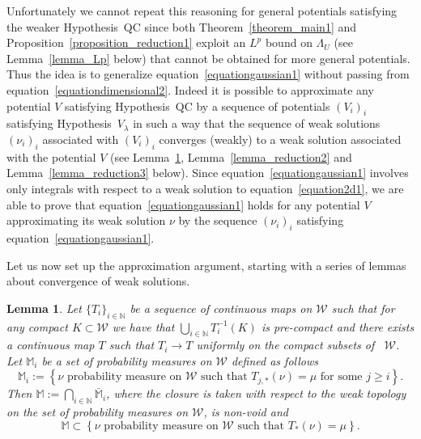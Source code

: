 \documentclass[a4paper,10pt]{article}
\newcommand{\assign}{:=}
\newcommand{\asterisk}{\mathord{*}}
\newtheorem{lemma}[theorem]{Lemma}
\begin{document}
Unfortunately we cannot repeat this reasoning for general potentials
satisfying the weaker Hypothesis~QC since both Theorem~\ref{theorem_main1} and
Proposition~\ref{proposition_reduction1} exploit an $L^p$ bound on $\Lambda_U$
(see Lemma~\ref{lemma_Lp} below) that cannot be obtained for more general
potentials. Thus the idea is to generalize
equation~{\eqref{equationgaussian1}} without passing from
equation~{\eqref{equationdimensional2}}. Indeed it is possible to approximate
any potential $V$ satisfying Hypothesis~QC by a sequence of potentials
$(V_i)_i$ satisfying Hypothesis~$V_{\lambda}$ in such a way that the sequence
of weak solutions $(\nu_i)_i$ associated with $(V_i)_i$ converges (weakly) to
a weak solution associated with the potential $V$ (see
Lemma~\ref{lemma_reduction1}, Lemma~\ref{lemma_reduction2} and
Lemma~\ref{lemma_reduction3} below). Since
equation~{\eqref{equationgaussian1}} involves only integrals with respect to a
weak solution to equation~{\eqref{equation2d1}}, we are able to prove that
equation~{\eqref{equationgaussian1}} holds for any potential $V$ approximating
its weak solution $\nu$ by the sequence $(\nu_i)_i$ satisfying
equation~{\eqref{equationgaussian1}}. \

Let us now set up the approximation argument, starting with a series of
lemmas about convergence of weak solutions.

\begin{lemma}
  \label{lemma_reduction1}Let $\{ T_i \}_{i \in \mathbb{N}}$ be a sequence of
  continuous maps on $\mathcal{W}$ such that for any compact $K \subset
  \mathcal{W}$ we have that $\bigcup_{i \in \mathbb{N}} T_i^{- 1} (K)$ is
  pre-compact and there exists a continuous map $T$ such that $T_i \rightarrow
  T$ uniformly on the compact subsets of \ $\mathcal{W}$. Let $\mathbb{M}_i$
  be a set of probability measures on $\mathcal{W}$ defined as follows
  \[ \mathbb{M}_i \assign \left\{ \text{$\nu$ probability measure on
     $\mathcal{W}$ such that $T_{j, \asterisk} (\nu) = \mu$ for some $j
     \geqslant i$} \right\} . \]
  Then $\mathbb{M} \assign \bigcap_{i \in \mathbb{N}} \bar{\mathbb{M}}_i$,
  where the closure is taken with respect to the weak topology on the set of
  probability measures on $\mathcal{W}$, is non-void and
  \[ \mathbb{M} \subset \left\{ \text{$\nu$ probability measure on
     $\mathcal{W}$ such that $T_{\asterisk} (\nu) = \mu$} \right\} . \]
\end{lemma}
\end{document}

